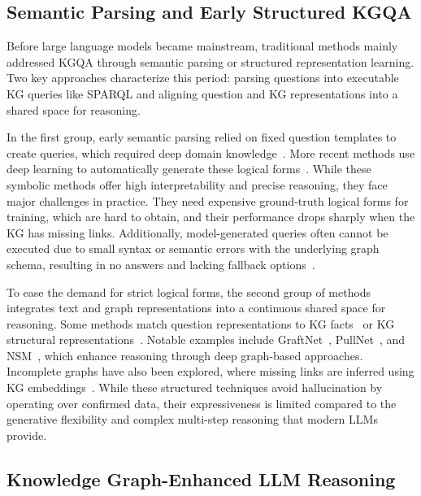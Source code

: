\subsection{Semantic Parsing and Early Structured KGQA}

Before large language models became mainstream, traditional methods mainly addressed KGQA through semantic parsing or structured representation learning. Two key approaches characterize this period: parsing questions into executable KG queries like SPARQL and aligning question and KG representations into a shared space for reasoning.

In the first group, early semantic parsing relied on fixed question templates to create queries, which required deep domain knowledge~\citep{berant2013,reddy2014,bast2015}. More recent methods use deep learning to automatically generate these logical forms~\citep{yih2015,lan2020sparql}. While these symbolic methods offer high interpretability and precise reasoning, they face major challenges in practice. They need expensive ground-truth logical forms for training, which are hard to obtain, and their performance drops sharply when the KG has missing links. Additionally, model-generated queries often cannot be executed due to small syntax or semantic errors with the underlying graph schema, resulting in no answers and lacking fallback options~\citep{yu2023decaf,luo2025-graph-constrained-reasoning}.

To ease the demand for strict logical forms, the second group of methods integrates text and graph representations into a continuous shared space for reasoning. Some methods match question representations to KG facts~\citep{miller2016,xu2019} or KG structural representations~\citep{zhang2018,sen-etal-2023-knowledge}. Notable examples include GraftNet~\citep{sun2018graftnet}, PullNet~\citep{sun2019pullnet}, and NSM~\citep{he2021nsm}, which enhance reasoning through deep graph-based approaches. Incomplete graphs have also been explored, where missing links are inferred using KG embeddings~\citep{saxena2020}. While these structured techniques avoid hallucination by operating over confirmed data, their expressiveness is limited compared to the generative flexibility and complex multi-step reasoning that modern LLMs provide.

\subsection{Knowledge Graph-Enhanced LLM Reasoning}

